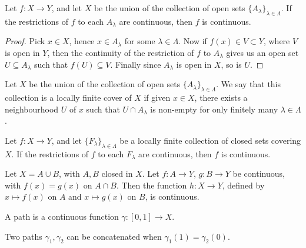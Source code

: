 \documentclass[11pt]{article}
\theoremstyle{definition}
\theoremstyle{remark}
\numberwithin{equation}{section}
\begin{document}
    \begin{theorem}
        Let $f\colon X \to Y$, and let $X$ be the union of the collection of open
        sets $\{A_\lambda\}_{\lambda \in \Lambda}$. If the restrictions of $f$ to
        each $A_\lambda$ are continuous, then $f$ is continuous.
    \end{theorem}
    \begin{proof}
        Pick $x \in X$, hence $x \in A_\lambda$ for some $\lambda \in \Lambda$. Now
        if $f(x) \in V \subset Y$, where $V$ is open in $Y$, then the continuity of
        the restriction of $f$ to $A_\lambda$ gives us an open set $U \subseteq
        A_\lambda$ such that $f(U) \subseteq V$. Finally since $A_\lambda$ is open in
        $X$, so is $U$.
    \end{proof}
    
    \begin{definition}
        Let $X$ be the union of the collection of open sets $\{A_\lambda\}_{\lambda
        \in \Lambda}$. We say that this collection is a locally finite cover of $X$
        if given $x \in X$, there exists a neighbourhood $U$ of $x$ such that $U \cap
        A_\lambda$ is non-empty for only finitely many $\lambda \in \Lambda$.
    \end{definition}
    
    \begin{theorem}
        Let $f\colon X \to Y$, and let $\{F_\lambda\}_{\lambda \in \Lambda}$ be a
        locally finite collection of closed sets covering $X$. If the restrictions of
        $f$ to each $F_\lambda$ are continuous, then $f$ is continuous.
    \end{theorem}

    \begin{corollary}
        Let $X = A\cup B$, with $A, B$ closed in $X$. Let $f\colon A \to Y$, $g\colon
        B \to Y$ be continuous, with $f(x) = g(x)$ on $A \cap B$. Then the function
        $h\colon X \to Y$, defined by $x\mapsto f(x)$ on $A$ and $x\mapsto g(x)$ on
        $B$, is continuous.
    \end{corollary}

    \begin{definition}
        A path is a continuous function $\gamma\colon [0, 1] \to X$.
    \end{definition}

    \begin{lemma}
        Two paths $\gamma_1, \gamma_2$ can be concatenated when $\gamma_1(1) =
        \gamma_2(0)$.
    \end{lemma}
\end{document}
